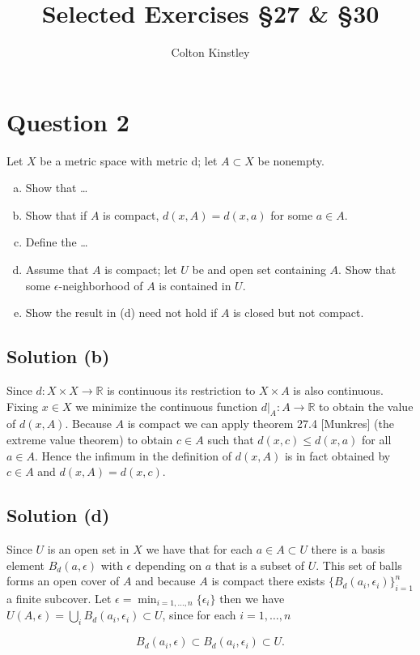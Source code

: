 \documentclass[11pt, oneside]{article}   	%
\title{Selected Exercises \S27 \& \S30}
\author{Colton Kinstley}
\newcommand{\R}{\mathbb{R}}
\newcommand{\set}[1]{\{ #1 \}}
\begin{document}
\maketitle

\section*{Question 2}
Let $X$ be a metric space with metric d; let $A \subset X$ be nonempty.
\begin{enumerate}[(a)]
\item
Show that \dots
\item
Show that if $A$ is compact, $d(x,A) = d(x,a) $ for some $a \in A$.
\item
Define the \dots
\item
Assume that $A$ is compact; let $U$ be and open set containing $A$. Show that some $\epsilon$-neighborhood of $A$ is contained in $U$. 
\item
Show the result in (d) need not hold if $A$ is closed but not compact.
\end{enumerate}

\subsection*{Solution (b)}
Since $d: X \times X \to \R$ is continuous its restriction to $X \times A$ is also continuous. Fixing $x \in X$ we minimize the continuous function $d \big \vert_A:A \to \R$ to obtain the value of $d(x,A)$. Because $A$ is compact we can apply theorem 27.4 [Munkres]  (the extreme value theorem) to obtain $c \in A$ such that $d(x,c) \leq d(x,a)$ for all $a \in A$. Hence the infimum in the definition of $d(x,A)$ is in fact obtained by $c \in A$ and $d(x,A) = d(x,c)$.

\subsection*{Solution (d)}
Since $U$ is an open set in $X$ we have that for each $a \in A \subset U$ there is a basis element $B_d(a,\epsilon)$ with $\epsilon$ depending on $a$ that is a subset of $U$. This set of balls forms an open cover of $A$ and because $A$ is compact there exists $\set{B_d(a_i,\epsilon_i)}_{i=1}^n$ a finite subcover. Let $\epsilon = \min_{i=1, \dots, n} \set{ \epsilon_i}$ then we have $U(A,\epsilon) = \bigcup_i B_d(a_i,\epsilon_i) \subset U$, since for each $i = 1, \dots, n$

\[
B_d(a_i,\epsilon) \subset B_d(a_i,\epsilon_i) \subset U.
\]
\end{document}
